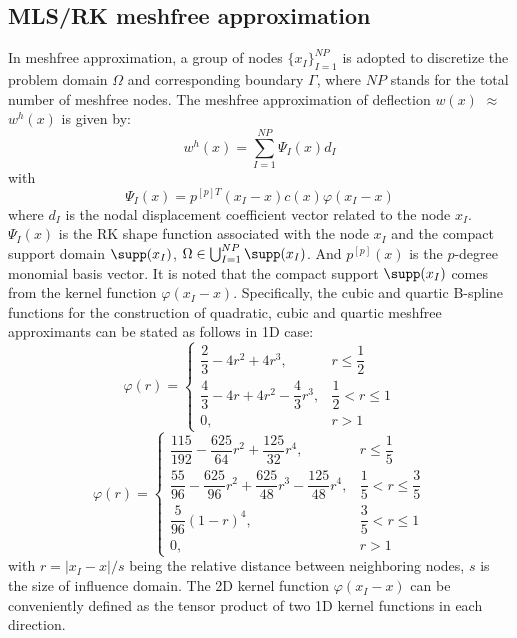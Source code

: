 \subsection{MLS/RK meshfree approximation}\label{sec:mls}

In meshfree approximation, a group of nodes $\{x_I\}_{I=1}^{NP}$ is adopted to discretize the problem domain $\Omega$ and corresponding boundary $\Gamma$, where $NP$ stands for the total number of meshfree nodes.
The meshfree approximation of deflection $w(x)$ $\approx$ $w^{h}(x)$ is given by:
\begin{equation}\label{eq:7}
w^{h}(x)=\sum_{I=1}^{NP}\Psi_I(x)d_I
\end{equation}
with
\begin{equation}\label{eq:8}
\Psi_I(x)=p^{[p]T}(x_I-x)c(x)\varphi(x_I-x)
\end{equation}
where $d_I$ is the nodal displacement coefficient vector related to the node $x_I$. $\Psi_I(x)$ is the RK shape function associated with the node $x_I$ and the compact support domain $\supp(x_I)$, $\Omega\in\bigcup_{I=1}^{NP}\supp(x_I)$.
And $p^{[p]}(x)$ is the $p$-degree monomial basis vector.
It is noted that the compact support $\supp(x_I)$ comes from the kernel function $\varphi(x_I-x)$.
Specifically, the cubic and quartic B-spline functions for the construction of quadratic, cubic and quartic meshfree approximants can be stated as follows in 1D case:
\begin{equation}\label{eq:9}
\varphi(r)=\begin{cases}
\dfrac{2}{3}-4r^{2}+4r^{3}, & r\le\dfrac{1}{2}\\[8pt]
\dfrac{4}{3}-4r+4r^{2}-\dfrac{4}{3}r^{3}, & \dfrac{1}{2}<r\le1\\[8pt]
0, & r>1
\end{cases}
\end{equation}
\begin{equation}\label{eq:10}
\varphi(r)=\begin{cases}
\dfrac{115}{192}-\dfrac{625}{64}r^{2}+\dfrac{125}{32}r^{4}, & r\le\dfrac{1}{5}\\[8pt]
\dfrac{55}{96}-\dfrac{625}{96}r^{2}+\dfrac{625}{48}r^{3}-\dfrac{125}{48}r^{4}, & \dfrac{1}{5}<r\le\dfrac{3}{5}\\[8pt]
\dfrac{5}{96}(1-r)^{4}, & \dfrac{3}{5}<r\le1\\[8pt]
0, & r>1
\end{cases}
\end{equation}
with $r=|x_I-x|/s$ being the relative distance between neighboring nodes, $s$ is the size of influence domain.
The 2D kernel function $\varphi(x_I-x)$ can be conveniently defined as the tensor product of two 1D kernel functions in each direction.

